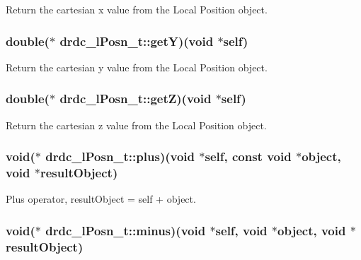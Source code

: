 Return the cartesian x value from the Local Position object. 

\hypertarget{structdrdc__lPosn__t_0cd1f3c953fb21ce05b6a1ed583dd101}{
\subsubsection[getY]{\setlength{\rightskip}{0pt plus 5cm}double($\ast$ {\bf drdc\_\-lPosn\_\-t::getY})(void $\ast$self)}}
\label{structdrdc__lPosn__t_0cd1f3c953fb21ce05b6a1ed583dd101}


Return the cartesian y value from the Local Position object. 

\hypertarget{structdrdc__lPosn__t_4511ab519ad38c9cffcd682da010d4e1}{
\subsubsection[getZ]{\setlength{\rightskip}{0pt plus 5cm}double($\ast$ {\bf drdc\_\-lPosn\_\-t::getZ})(void $\ast$self)}}
\label{structdrdc__lPosn__t_4511ab519ad38c9cffcd682da010d4e1}


Return the cartesian z value from the Local Position object. 

\hypertarget{structdrdc__lPosn__t_bbb83aef73c231ac706d12132d4af780}{
\subsubsection[plus]{\setlength{\rightskip}{0pt plus 5cm}void($\ast$ {\bf drdc\_\-lPosn\_\-t::plus})(void $\ast$self, const void $\ast$object, void $\ast$resultObject)}}
\label{structdrdc__lPosn__t_bbb83aef73c231ac706d12132d4af780}


Plus operator, resultObject = self + object. 

\hypertarget{structdrdc__lPosn__t_825ce63786dc54e858080283e77d094c}{
\subsubsection[minus]{\setlength{\rightskip}{0pt plus 5cm}void($\ast$ {\bf drdc\_\-lPosn\_\-t::minus})(void $\ast$self, void $\ast$object, void $\ast$resultObject)}}
\label{structdrdc__lPosn__t_825ce63786dc54e858080283e77d094c}


